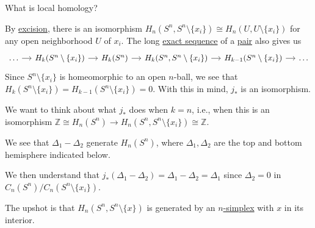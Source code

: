 \begin{problem}
What is local homology?
\end{problem}
\begin{answer}
	By \hyperref[thm:excision]{excision}, there is an isomorphism \(H_n(S^n, S^n \setminus \{x_i\}) \cong H_n(U, U \setminus \{x_i\})\) for any open neighborhood \(U\) of \(x_i\). The long \hyperref[def:exact-sequence]{exact sequence} of a \hyperref[def:good-pair]{pair} also gives us
	\[
		\begin{tikzcd}[column sep=small]
			\dots & {H_k(S^n\setminus\{x_i\})} & {H_k(S^n)} & {H_k(S^n, S^n\setminus\{x_i\})} & {H_{k-1}(S^n\setminus\{x_i\})} & \dots
			\arrow[from=1-1, to=1-2]
			\arrow[from=1-2, to=1-3]
			\arrow[from=1-3, to=1-4]
			\arrow[from=1-4, to=1-5]
			\arrow[from=1-5, to=1-6]
		\end{tikzcd}
	\]
	Since \(S^n \setminus \{x_i\}\) is homeomorphic to an open \(n\)-ball, we see that \(H_k(S^n \setminus \{x_i\}) = H_{k - 1}(S^n \setminus \{x_i\}) = 0\). With this in mind, \(j_\ast\) is an isomorphism.

	We want to think about what \(j_\ast\) does when \(k = n\), i.e., when this is an isomorphism \(\mathbb{Z}\cong H_n(S^n) \to H_n(S^n, S^n \setminus \{x_i\}) \cong \mathbb{Z}\).

	We see that \(\Delta_1 - \Delta_2\) generate \(H_n(S^n)\), where \(\Delta_1, \Delta_2\) are the top and bottom hemisphere indicated below.
	\begin{figure}[H]
		\centering
		\label{fig:les-on-relative-spheres}
	\end{figure}
	We then understand that \(j_\ast(\Delta_1 - \Delta_2) = \Delta_1 - \Delta_2 = \Delta_1\) since \(\Delta_2 = 0\) in \(C_n(S^n)/C_n(S^n \setminus \{x_i\})\).

	The upshot is that \(H_n(S^n, S^n \setminus \{x\})\) is generated by an \hyperref[def:standard-simplex]{\(n\)-simplex} with \(x\) in its interior.


\end{answer}
